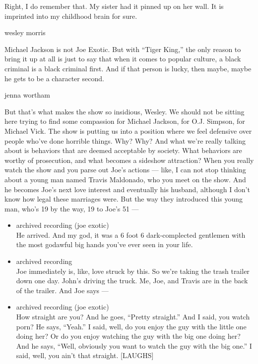 Right, I do remember that. My sister had it pinned up on her wall. It is
imprinted into my childhood brain for sure.

wesley morris

Michael Jackson is not Joe Exotic. But with ``Tiger King,'' the only
reason to bring it up at all is just to say that when it comes to
popular culture, a black criminal is a black criminal first. And if that
person is lucky, then maybe, maybe he gets to be a character second.

jenna wortham

But that's what makes the show so insidious, Wesley. We should not be
sitting here trying to find some compassion for Michael Jackson, for
O.J. Simpson, for Michael Vick. The show is putting us into a position
where we feel defensive over people who've done horrible things. Why?
Why? And what we're really talking about is behaviors that are deemed
acceptable by society. What behaviors are worthy of prosecution, and
what becomes a sideshow attraction? When you really watch the show and
you parse out Joe's actions --- like, I can not stop thinking about a
young man named Travis Maldonado, who you meet on the show. And he
becomes Joe's next love interest and eventually his husband, although I
don't know how legal these marriages were. But the way they introduced
this young man, who's 19 by the way, 19 to Joe's 51 ---

\begin{itemize}
\item
  archived recording (joe exotic)\\
  He arrived. And my god, it was a 6 foot 6 dark-complected gentlemen
  with the most godawful big hands you've ever seen in your life.
\item
  archived recording\\
  Joe immediately is, like, love struck by this. So we're taking the
  trash trailer down one day. John's driving the truck. Me, Joe, and
  Travis are in the back of the trailer. And Joe says ---
\item
  archived recording (joe exotic)\\
  How straight are you? And he goes, ``Pretty straight.'' And I said,
  you watch porn? He says, ``Yeah.'' I said, well, do you enjoy the guy
  with the little one doing her? Or do you enjoy watching the guy with
  the big one doing her? And he says, ``Well, obviously you want to
  watch the guy with the big one.'' I said, well, you ain't that
  straight. {[}LAUGHS{]}
\end{itemize}

